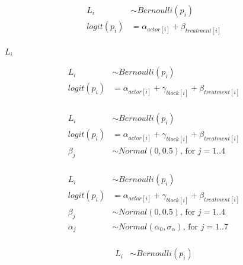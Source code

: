 \documentclass[10pt]{book}
\begin{document}
\begin{mdSnippets}
\begin{mdDisplaySnippet}
\[%
\begin{aligned}
L_i & \sim Bernoulli(p_i) \\ 
logit(p_i) &= \alpha_{actor[i]} + \beta_{treatment[i]} \\
\end{aligned}
\]%
\end{mdDisplaySnippet}%
\begin{mdInlineSnippet}%
{$L_i$}\end{mdInlineSnippet}%
\begin{mdDisplaySnippet}[0c067e7d88535bd6ec7b0ac63ced3905]%
\[%
\begin{aligned}
L_i & \sim Bernoulli(p_i) \\ 
logit(p_i) &= \alpha_{actor[i]} + \gamma_{block[i]} + \beta_{treatment[i]} \\
\end{aligned}
\]%
\end{mdDisplaySnippet}%
\begin{mdDisplaySnippet}[1773721e30e3c5656c062ea3117e16fb]%
\[%
\begin{aligned}
L_i & \sim Bernoulli(p_i) \\ 
logit(p_i) &= \alpha_{actor[i]} + \gamma_{block[i]} + \beta_{treatment[i]} \\
\beta_j &\sim Normal(0, 0.5)\text{, for } j = 1..4 \\
\end{aligned}
\]%
\end{mdDisplaySnippet}%
\begin{mdDisplaySnippet}[46843eb80eb434d4501c8a220ce76d02]%
\[%
\begin{aligned}
L_i & \sim Bernoulli(p_i) \\ 
logit(p_i) &= \alpha_{actor[i]} + \gamma_{block[i]} + \beta_{treatment[i]} \\
\beta_j &\sim Normal(0, 0.5)\text{, for } j = 1..4 \\
\alpha_j &\sim Normal(\alpha_0, \sigma_{\alpha})\text{, for } j = 1..7 \\
\end{aligned}
\]%
\end{mdDisplaySnippet}%
\begin{mdDisplaySnippet}[78669eb13fbf088c3b8a9a3d55a9a3c5]%
\[%
\begin{aligned}
L_i & \sim Bernoulli(p_i) \\ 

\end{aligned}\]
\end{mdDisplaySnippet}
\end{mdSnippets}
\end{document}
